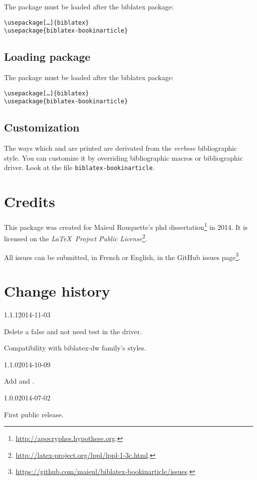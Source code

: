 \documentclass{ltxdockit}[2011/03/25]
\newcommand{\biblatex}{biblatex\xspace}
\begin{document}
The package must be loaded after the \biblatex package:
\begin{verbatim}
\usepackage[…]{biblatex}
\usepackage{biblatex-bookinarticle}
\end{verbatim}

\subsection{Loading package}

The package must be loaded after the \biblatex package:
\begin{verbatim}
\usepackage[…]{biblatex}
\usepackage{biblatex-bookinarticle}
\end{verbatim}

\subsection{Customization}

The ways which  and  are printed are derivated from the \emph{verbose} bibliographic style. You can customize it by overriding bibliographic macros or bibliographic driver. Look at the file \verb+biblatex-bookinarticle+.

\section{Credits}

This package was created for Maïeul Rouquette's phd dissertation\footnote{\url{http://apocryphes.hypothese.org}.} in 2014. It is licensed on the \emph{\LaTeX\ Project Public License}\footnote{\url{http://latex-project.org/lppl/lppl-1-3c.html}.}. 


All issues can be submitted, in French or English, in the GitHub issues page\footnote{\url{https://github.com/maieul/biblatex-bookinarticle/issues}.}.


\section{Change history}


\begin{changelog}

\begin{release}{1.1.1}{2014-11-03}
\item Delete a false and not need test in the driver.
\item Compatibility with biblatex-dw family's styles.
\end{release}
\begin{release}{1.1.0}{2014-10-09}
\item Add  and .
\end{release}

\begin{release}{1.0.0}{2014-07-02}
\item First public release.
\end{release}
\end{changelog}
\end{document}
